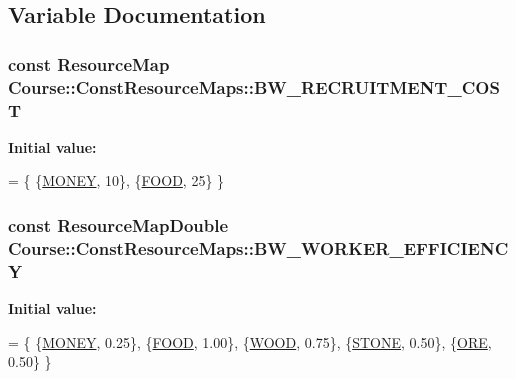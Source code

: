 \subsection{Variable Documentation}
\hypertarget{namespaceCourse_1_1ConstResourceMaps_a74eb093a146d0a0d2bfe74ca806e36c2}{
\subsubsection[{B\-W\-\_\-\-R\-E\-C\-R\-U\-I\-T\-M\-E\-N\-T\-\_\-\-C\-O\-S\-T}]{\setlength{\rightskip}{0pt plus 5cm}const {\bf Resource\-Map} Course\-::\-Const\-Resource\-Maps\-::\-B\-W\-\_\-\-R\-E\-C\-R\-U\-I\-T\-M\-E\-N\-T\-\_\-\-C\-O\-S\-T}}\label{namespaceCourse_1_1ConstResourceMaps_a74eb093a146d0a0d2bfe74ca806e36c2}
{\bfseries Initial value\-:}
\begin{DoxyCode}
= \{
    \{\hyperlink{namespaceCourse_a02d49c04029594d4adba79b84bb85f65aff016add6bbbdbb44abf1d2d7f215ec0}{MONEY}, 10\},
    \{\hyperlink{namespaceCourse_a02d49c04029594d4adba79b84bb85f65a7018c47af38bfc1390a89e70b4cf4760}{FOOD}, 25\}
\}
\end{DoxyCode}
\hypertarget{namespaceCourse_1_1ConstResourceMaps_a895601aa763ac51bf37a0f640eb36c08}{
\subsubsection[{B\-W\-\_\-\-W\-O\-R\-K\-E\-R\-\_\-\-E\-F\-F\-I\-C\-I\-E\-N\-C\-Y}]{\setlength{\rightskip}{0pt plus 5cm}const {\bf Resource\-Map\-Double} Course\-::\-Const\-Resource\-Maps\-::\-B\-W\-\_\-\-W\-O\-R\-K\-E\-R\-\_\-\-E\-F\-F\-I\-C\-I\-E\-N\-C\-Y}}\label{namespaceCourse_1_1ConstResourceMaps_a895601aa763ac51bf37a0f640eb36c08}
{\bfseries Initial value\-:}
\begin{DoxyCode}
= \{
    \{\hyperlink{namespaceCourse_a02d49c04029594d4adba79b84bb85f65aff016add6bbbdbb44abf1d2d7f215ec0}{MONEY}, 0.25\},
    \{\hyperlink{namespaceCourse_a02d49c04029594d4adba79b84bb85f65a7018c47af38bfc1390a89e70b4cf4760}{FOOD}, 1.00\},
    \{\hyperlink{namespaceCourse_a02d49c04029594d4adba79b84bb85f65a87287be3009253b983ffb2e9f91eef22}{WOOD}, 0.75\},
    \{\hyperlink{namespaceCourse_a02d49c04029594d4adba79b84bb85f65a8598c3079c2be7785410e724cc190229}{STONE}, 0.50\},
    \{\hyperlink{namespaceCourse_a02d49c04029594d4adba79b84bb85f65af416a215c7dad21349df38d35be0a1e1}{ORE}, 0.50\}
\}
\end{DoxyCode}
